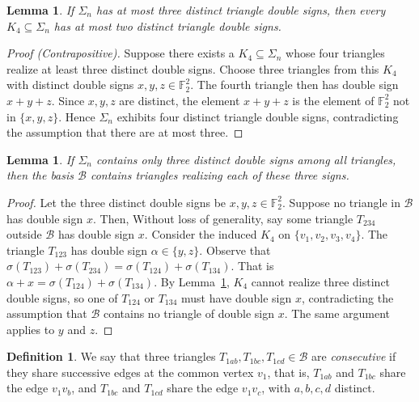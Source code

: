 \documentclass[12pt]{amsart}
\theoremstyle{plain}
\newtheorem{lemma}[theorem]{Lemma}
\theoremstyle{definition}%
\newtheorem{definition}{Definition}
\begin{document}
\begin{lemma}\label{lemma1}
If \(\Sigma_n\) has at most three distinct triangle double signs, then every \(K_4\subseteq \Sigma_n\) has at most two distinct triangle double signs.
\end{lemma}



\begin{proof}[Proof (Contrapositive)]
Suppose there exists a $K_4 \subseteq \Sigma_n$ whose four triangles realize at least three distinct
double signs. Choose three triangles from this $K_4$ with distinct double signs
$x,y,z \in \mathbb{F}_2^2$. The fourth triangle then has double sign $x+y+z$.
Since $x,y,z$ are distinct, the element $x+y+z$ is the
element of $\mathbb{F}_2^2$ not in $\{x,y,z\}$. Hence $\Sigma_n$ exhibits four distinct
triangle double signs, contradicting the assumption that there are at most three.
\end{proof}



\begin{lemma}\label{lemma5}
If \(\Sigma_n\) contains only three distinct  double signs among all triangles, then the basis \(\mathcal{B}\) contains triangles realizing each of these three signs. 
\end{lemma}
\begin{proof}
Let the three distinct double signs be \(x,y,z\in\mathbb F_2^2\). Suppose no triangle in \(\mathcal{B}\) has double sign \(x\).
Then, Without loss of generality, say some triangle \(T_{234}\) outside \(\mathcal{B}\) has double sign \(x\).
Consider the induced \(K_4\) on \(\{v_1,v_2,v_3,v_4\}\). The  triangle \(T_{123}\) has double sign
\(\alpha\in\{y,z\}\). Observe that $\sigma(T_{123})+\sigma(T_{234})=\sigma(T_{124})+\sigma(T_{134})$. That is $\alpha+x=\sigma(T_{124})+\sigma(T_{134})$. By Lemma~\ref{lemma1}, \(K_4\) cannot realize three distinct double signs,
so one of \(T_{124}\) or \(T_{134}\) must have double sign \(x\), contradicting the assumption
that \(\mathcal{B}\) contains no triangle of double sign \(x\). The same argument applies to \(y\) and \(z\).
\end{proof}





\begin{definition}
We say that three triangles \(T_{1ab},T_{1bc},T_{1cd} \in \mathcal{B}\) are \emph{consecutive} 
if they share successive edges at the common vertex \(v_1\), that is,
\(T_{1ab}\) and \(T_{1bc}\) share the edge \(v_1 v_b\), and
\(T_{1bc}\) and \(T_{1cd}\) share the edge \(v_1 v_c\),
with \(a,b,c,d\) distinct.
\end{definition}
\end{document}
